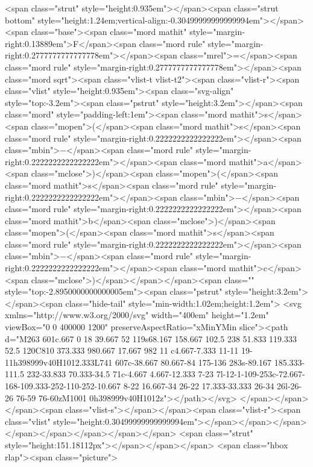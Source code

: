 <span class="strut" style="height:0.935em"></span><span class="strut bottom" style="height:1.24em;vertical-align:-0.30499999999999994em"></span><span class="base"><span class="mord mathit" style="margin-right:0.13889em">F</span><span class="mord rule" style="margin-right:0.2777777777777778em"></span><span class="mrel">=</span><span class="mord rule" style="margin-right:0.2777777777777778em"></span><span class="mord sqrt"><span class="vlist-t vlist-t2"><span class="vlist-r"><span class="vlist" style="height:0.935em"><span class="svg-align" style="top:-3.2em"><span class="pstrut" style="height:3.2em"></span><span class="mord" style="padding-left:1em"><span class="mord mathit">s</span><span class="mopen">(</span><span class="mord mathit">s</span><span class="mord rule" style="margin-right:0.2222222222222222em"></span><span class="mbin">−</span><span class="mord rule" style="margin-right:0.2222222222222222em"></span><span class="mord mathit">a</span><span class="mclose">)</span><span class="mopen">(</span><span class="mord mathit">s</span><span class="mord rule" style="margin-right:0.2222222222222222em"></span><span class="mbin">−</span><span class="mord rule" style="margin-right:0.2222222222222222em"></span><span class="mord mathit">b</span><span class="mclose">)</span><span class="mopen">(</span><span class="mord mathit">s</span><span class="mord rule" style="margin-right:0.2222222222222222em"></span><span class="mbin">−</span><span class="mord rule" style="margin-right:0.2222222222222222em"></span><span class="mord mathit">c</span><span class="mclose">)</span></span></span><span class="" style="top:-2.8950000000000005em"><span class="pstrut" style="height:3.2em"></span><span class="hide-tail" style="min-width:1.02em;height:1.2em">
<svg xmlns="http://www.w3.org/2000/svg" width="400em" height="1.2em" viewBox="0 0 400000 1200" preserveAspectRatio="xMinYMin slice"><path d="M263 601c.667 0 18 39.667 52 119s68.167
 158.667 102.5 238 51.833 119.333 52.5 120C810 373.333 980.667 17.667 982 11
c4.667-7.333 11-11 19-11h398999v40H1012.333L741 607c-38.667 80.667-84 175-136
 283s-89.167 185.333-111.5 232-33.833 70.333-34.5 71c-4.667 4.667-12.333 7-23
 7l-12-1-109-253c-72.667-168-109.333-252-110-252-10.667 8-22 16.667-34 26-22
 17.333-33.333 26-34 26l-26-26 76-59 76-60zM1001 0h398999v40H1012z"></path></svg>
</span></span></span><span class="vlist-s">​</span></span><span class="vlist-r"><span class="vlist" style="height:0.30499999999999994em"></span></span></span></span></span></span></span></span>
<span class="strut" style="height:151.18112px"></span></span></span> <span class="hbox rlap"><span class="picture">
